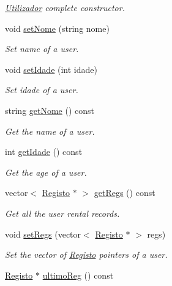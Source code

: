\begin{DoxyCompactItemize}
\begin{DoxyCompactList}\small\item\em \hyperlink{class_utilizador}{Utilizador} complete constructor. \end{DoxyCompactList}\item 
void \hyperlink{class_utilizador_a24f10fc3cfa2deb7aa38cc280722327a}{set\+Nome} (string nome)
\begin{DoxyCompactList}\small\item\em Set name of a user. \end{DoxyCompactList}\item 
void \hyperlink{class_utilizador_a1201b047034f08dd8b1e8d4df36ca97b}{set\+Idade} (int idade)
\begin{DoxyCompactList}\small\item\em Set idade of a user. \end{DoxyCompactList}\item 
string \hyperlink{class_utilizador_aa5af9c1385b0a93116dd8a80264b887a}{get\+Nome} () const 
\begin{DoxyCompactList}\small\item\em Get the name of a user. \end{DoxyCompactList}\item 
int \hyperlink{class_utilizador_a9abaeb6fbff49683f57164a57e6f0c90}{get\+Idade} () const 
\begin{DoxyCompactList}\small\item\em Get the age of a user. \end{DoxyCompactList}\item 
vector$<$ \hyperlink{class_registo}{Registo} $\ast$ $>$ \hyperlink{class_utilizador_a41730715f6cdd5bd98e3647150836989}{get\+Regs} () const 
\begin{DoxyCompactList}\small\item\em Get all the user rental records. \end{DoxyCompactList}\item 
void \hyperlink{class_utilizador_a6a319b5af1400354e5fc22056fbfefc5}{set\+Regs} (vector$<$ \hyperlink{class_registo}{Registo} $\ast$ $>$ regs)
\begin{DoxyCompactList}\small\item\em Set the vector of \hyperlink{class_registo}{Registo} pointers of a user. \end{DoxyCompactList}\item 
\hyperlink{class_registo}{Registo} $\ast$ \hyperlink{class_utilizador_aadf5270d1131da77040b628c23ef89b2}{ultimo\+Reg} () const 

\end{DoxyCompactItemize}

